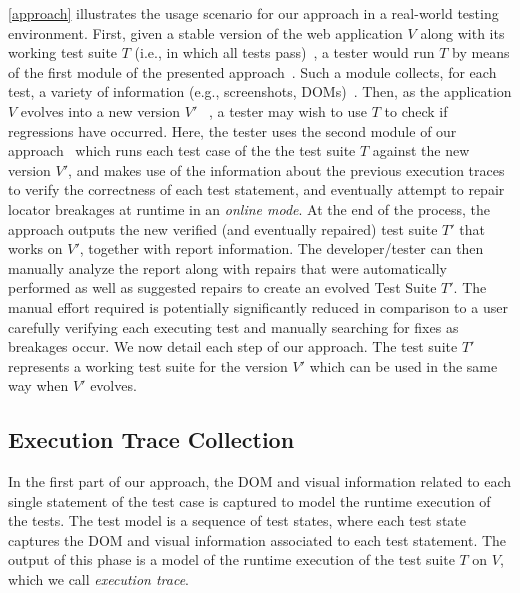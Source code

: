 \autoref{approach} illustrates the usage scenario for our approach in a real-world testing environment. 
First, given a stable version of the web application $V$ along with its working test suite $T$ (i.e., in which all tests pass)~, a tester would run $T$ by means of the first module of the presented approach~. Such a module collects, for each test, a variety of information (e.g., screenshots, DOMs)~. 
Then, as the application $V$ evolves into a new version $V'$ ~, a tester may wish to use $T$ to check if regressions have occurred. Here, the tester uses the second module of our approach~ which runs each test case of the the test suite $T$ against the new version $V'$, and makes use of the information about the previous execution traces to verify the correctness of each test statement, and eventually attempt to repair locator breakages at runtime in an \textit{online mode}. At the end of the process, the approach outputs the new verified (and eventually repaired) test suite $T'$ that works on $V'$, together with report information. 
The developer/tester can then manually analyze the report along with repairs that were automatically performed as well as suggested repairs to create an evolved Test Suite $T'$. The manual effort required is potentially significantly reduced in comparison to a user carefully verifying each executing test and manually searching for fixes as breakages occur. %
We now detail each step of our approach. The test suite $T'$ represents a working test suite for the version $V'$ which can be used in the same way when $V'$ evolves. 

\subsection{Execution Trace Collection}
%
In the first part of our approach, the DOM and visual information related to each single statement of the test case is captured to model the runtime execution of the tests. The test model is a sequence of test states, where each test state captures the DOM and visual information associated to each test statement. The output of this phase is a model of the runtime execution of the test suite $T$ on $V$, which we call \textit{execution trace}.



